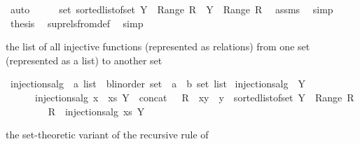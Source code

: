 \begin{isabellebody}
\ auto\isanewline
\ \ \isamarkupfalse%
\ \isamarkupfalse%
\ {\isachardoublequoteopen}set\ {\isacharparenleft}sorted{\isacharunderscore}list{\isacharunderscore}of{\isacharunderscore}set\ {\isacharparenleft}Y\ {\isacharminus}\ Range\ R{\isacharparenright}{\isacharparenright}\ {\isacharequal}\ Y\ {\isacharminus}\ Range\ R{\isachardoublequoteclose}\ \isamarkupfalse%
\ assms\ \isamarkupfalse%
\ simp\isanewline
\ \ \isamarkupfalse%
\ \isamarkupfalse%
\ {\isacharquery}thesis\ \isamarkupfalse%
\ sup{\isacharunderscore}rels{\isacharunderscore}from{\isacharunderscore}def\ \isamarkupfalse%
\ simp\isanewline
{}\isamarkupfalse%
%
\endisatagproof
{\isafoldproof}%
%
\isadelimproof
%
\endisadelimproof
%
\begin{isamarkuptext}%
the list of all injective functions (represented as relations) from one set 
  (represented as a list) to another set%
\end{isamarkuptext}%
\isamarkuptrue%
\isamarkupfalse%
\ injections{\isacharunderscore}alg\ {\isacharcolon}{\isacharcolon}\ {\isachardoublequoteopen}{\isacharprime}a\ list\ {\isasymRightarrow}\ {\isacharprime}b{\isasymColon}linorder\ set\ {\isasymRightarrow}\ {\isacharparenleft}{\isacharprime}a\ {\isasymtimes}\ {\isacharprime}b{\isacharparenright}\ set\ list{\isachardoublequoteclose}\isanewline
{}\ {\isachardoublequoteopen}injections{\isacharunderscore}alg\ {\isacharbrackleft}{\isacharbrackright}\ Y\ {\isacharequal}\ {\isacharbrackleft}{\isacharbraceleft}{\isacharbraceright}{\isacharbrackright}{\isachardoublequoteclose}\ {\isacharbar}\isanewline
\ \ \ \ \ \ {\isachardoublequoteopen}injections{\isacharunderscore}alg\ {\isacharparenleft}x\ {\isacharhash}\ xs{\isacharparenright}\ Y\ {\isacharequal}\ concat\ {\isacharbrackleft}\ {\isacharbrackleft}\ R\ {\isacharplus}{\isacharasterisk}\ {\isacharbraceleft}{\isacharparenleft}x{\isacharcomma}y{\isacharparenright}{\isacharbraceright}\ {\isachardot}\ y\ {\isasymleftarrow}\ sorted{\isacharunderscore}list{\isacharunderscore}of{\isacharunderscore}set\ {\isacharparenleft}Y\ {\isacharminus}\ Range\ R{\isacharparenright}\ {\isacharbrackright}\isanewline
\ \ \ \ \ \ {\isachardot}\ R\ {\isasymleftarrow}\ injections{\isacharunderscore}alg\ xs\ Y\ {\isacharbrackright}{\isachardoublequoteclose}%
\begin{isamarkuptext}%
the set-theoretic variant of the recursive rule of %

\end{isamarkuptext}
\end{isabellebody}
